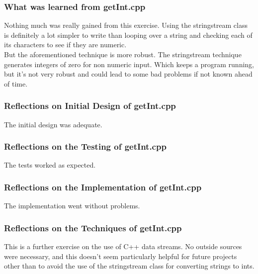 \documentclass[11pt, oneside]{memoir}
\begin{document}
\subsubsection{What was learned from getInt.cpp}

Nothing much was really gained from this exercise.  Using the
stringstream class is definitely a lot simpler to write than looping
over a string and checking each of its characters to see if they are
numeric. \\

But the aforementioned technique is more robust.  The stringstream
technique generates integers of zero for non numeric input.  Which
keeps a program running, but it's not very robust and could lead to
some bad problems if not known ahead of time. 

\subsubsection{Reflections on Initial Design of getInt.cpp}

The initial design was adequate.

\subsubsection{Reflections on the Testing of getInt.cpp}

The tests worked as expected.

\subsubsection{Reflections on the Implementation of getInt.cpp}

The implementation went without problems.


\subsubsection{Reflections on the Techniques of getInt.cpp}

This is a further exercise on the use of C++ data streams.  No outside
sources were necessary, and this doesn't seem particularly helpful for
future projects other than to avoid the use of the stringstream class
for converting strings to ints.
\end{document}
